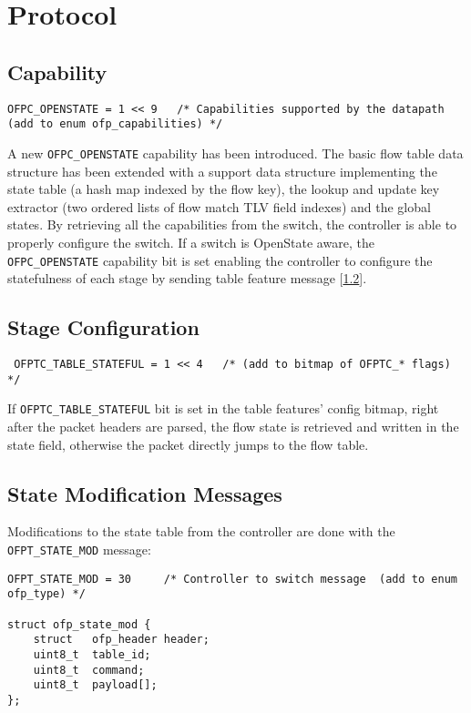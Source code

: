 
\chapter{Protocol}
\label{chap:protocol}

\section{Capability}
\label{sec:capability}
\scriptsize
\begin{verbatim}
OFPC_OPENSTATE = 1 << 9   /* Capabilities supported by the datapath (add to enum ofp_capabilities) */
\end{verbatim}
\normalsize
\noindent
A new \texttt{OFPC\_OPENSTATE} capability has been introduced.
The basic flow table data structure has been extended with a support data structure implementing the state table (a hash map indexed by the flow key), the lookup and update key extractor (two ordered lists of flow match TLV field indexes) and the global states.
By retrieving all the capabilities from the switch, the controller is able to properly configure the switch. If a switch is OpenState aware, the \texttt{OFPC\_OPENSTATE} capability bit is set enabling the controller to configure the statefulness of each stage by sending table feature message [\ref{sec:table_conf}].

\section{Stage Configuration}
\label{sec:table_conf}
\scriptsize
\begin{verbatim}
 OFPTC_TABLE_STATEFUL = 1 << 4   /* (add to bitmap of OFPTC_* flags) */
\end{verbatim}
\normalsize
If \texttt{OFPTC\_TABLE\_STATEFUL} bit is set in the table features' config bitmap, right after the packet headers are parsed, the flow state is retrieved and written in the state field, otherwise the packet directly jumps to the flow table. 

\section{State Modification Messages}

\label{sec:msg_set_state_proto}

Modifications to the state table from the controller are done with the \texttt{OFPT\_STATE\_MOD} message:
\scriptsize
\begin{verbatim}
OFPT_STATE_MOD = 30     /* Controller to switch message  (add to enum ofp_type) */

struct ofp_state_mod {
    struct   ofp_header header;
    uint8_t  table_id;
    uint8_t  command;
    uint8_t  payload[];
};
\end{verbatim}
\normalsize

